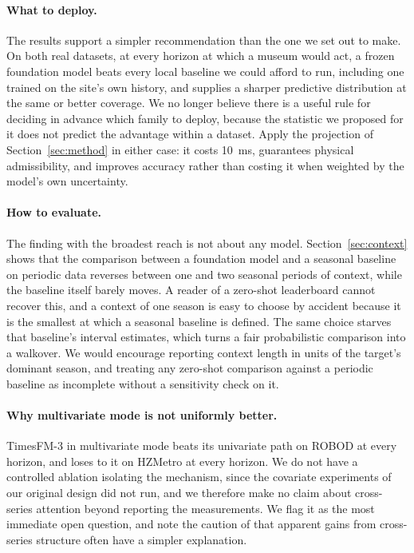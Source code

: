 \documentclass[11pt]{article}
\theoremstyle{plain}
\theoremstyle{definition}
\theoremstyle{remark}
\begin{document}
\paragraph{What to deploy.}
The results support a simpler recommendation than the one we set out to make. On both real datasets, at every horizon at which a museum would act, a frozen foundation model beats every local baseline we could afford to run, including one trained on the site's own history, and supplies a sharper predictive distribution at the same or better coverage. We no longer believe there is a useful rule for deciding in advance which family to deploy, because the statistic we proposed for it does not predict the advantage within a dataset. Apply the projection of Section~\ref{sec:method} in either case: it costs \SI{10}{\milli\second}, guarantees physical admissibility, and improves accuracy rather than costing it when weighted by the model's own uncertainty.

\paragraph{How to evaluate.}
The finding with the broadest reach is not about any model. Section~\ref{sec:context} shows that the comparison between a foundation model and a seasonal baseline on periodic data reverses between one and two seasonal periods of context, while the baseline itself barely moves. A reader of a zero-shot leaderboard cannot recover this, and a context of one season is easy to choose by accident because it is the smallest at which a seasonal baseline is defined. The same choice starves that baseline's interval estimates, which turns a fair probabilistic comparison into a walkover. We would encourage reporting context length in units of the target's dominant season, and treating any zero-shot comparison against a periodic baseline as incomplete without a sensitivity check on it.

\paragraph{Why multivariate mode is not uniformly better.}
TimesFM-3 in multivariate mode beats its univariate path on ROBOD at every horizon, and loses to it on HZMetro at every horizon. We do not have a controlled ablation isolating the mechanism, since the covariate experiments of our original design did not run, and we therefore make no claim about cross-series attention beyond reporting the measurements. We flag it as the most immediate open question, and note the caution of \citet{shao2022stid} that apparent gains from cross-series structure often have a simpler explanation.
\end{document}
